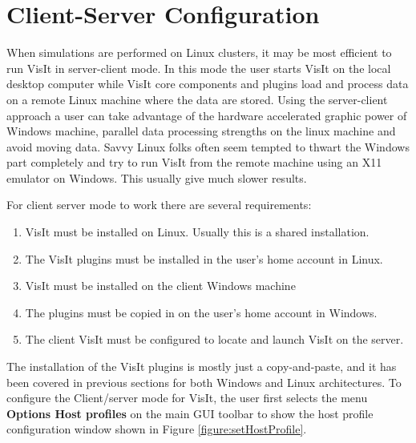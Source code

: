 \documentclass[12pt]{report}
\begin{document}
\section{Client-Server Configuration}
\label{chap:client}
When simulations are performed on Linux clusters, it may be most efficient to run VisIt in server-client mode. 
In this mode the user starts VisIt on the local desktop computer while VisIt core components and plugins load 
and process data on a remote Linux machine where the  data are stored. Using the server-client approach a user can 
take advantage of the hardware accelerated graphic power of Windows machine, parallel data processing strengths 
on the linux machine and avoid moving data. Savvy Linux folks often seem tempted to thwart the Windows part 
completely and try to run VisIt from the remote machine using an X11 emulator on Windows. This usually give much slower results.

For client server mode to work there are several requirements:
\begin{enumerate}
\item VisIt must be installed on Linux. Usually this is a shared installation.
\item The VisIt plugins must be installed in the user's home account in Linux. 
\item VisIt must be installed on the client Windows machine
\item The plugins must be copied in on the user's home account in Windows.
\item The client VisIt must be configured to locate and launch VisIt on the server.
\end{enumerate}

The installation of the VisIt plugins is mostly just a copy-and-paste, and it has been covered in previous sections for both Windows and Linux architectures. To configure the Client/server mode for VisIt, the user first selects the menu {\bf Options \textrightarrow Host profiles} on the main GUI toolbar to show the host profile configuration window shown in Figure \ref{figure:setHostProfile}. 
\end{document}
